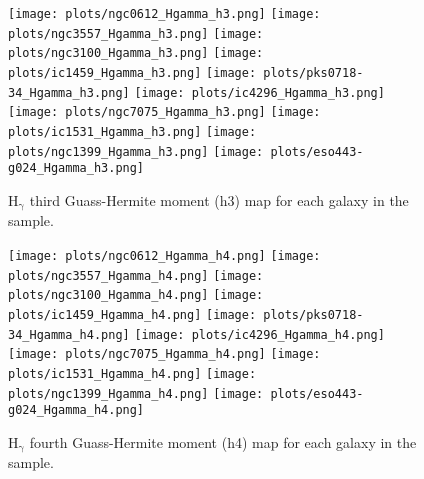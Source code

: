 \documentclass[fleqn,usenatbib,useAMS]{mnras}
\begin{document}
        \begin{figure*}
            \centering
            \texttt{[image: plots/ngc0612\_Hgamma\_h3.png]}
            \texttt{[image: plots/ngc3557\_Hgamma\_h3.png]}
            \texttt{[image: plots/ngc3100\_Hgamma\_h3.png]}
            \texttt{[image: plots/ic1459\_Hgamma\_h3.png]}
            \texttt{[image: plots/pks0718-34\_Hgamma\_h3.png]}
            \texttt{[image: plots/ic4296\_Hgamma\_h3.png]}
            \texttt{[image: plots/ngc7075\_Hgamma\_h3.png]}
            \texttt{[image: plots/ic1531\_Hgamma\_h3.png]}
            \texttt{[image: plots/ngc1399\_Hgamma\_h3.png]}
            \texttt{[image: plots/eso443-g024\_Hgamma\_h3.png]}
            \caption{H$_\mathrm{\gamma}$ third Guass-Hermite moment (h3) map for each galaxy in the sample.}
            \label{fig:Hgamma_h3}
        \end{figure*}


        \begin{figure*}
            \centering
            \texttt{[image: plots/ngc0612\_Hgamma\_h4.png]}
            \texttt{[image: plots/ngc3557\_Hgamma\_h4.png]}
            \texttt{[image: plots/ngc3100\_Hgamma\_h4.png]}
            \texttt{[image: plots/ic1459\_Hgamma\_h4.png]}
            \texttt{[image: plots/pks0718-34\_Hgamma\_h4.png]}
            \texttt{[image: plots/ic4296\_Hgamma\_h4.png]}
            \texttt{[image: plots/ngc7075\_Hgamma\_h4.png]}
            \texttt{[image: plots/ic1531\_Hgamma\_h4.png]}
            \texttt{[image: plots/ngc1399\_Hgamma\_h4.png]}
            \texttt{[image: plots/eso443-g024\_Hgamma\_h4.png]}
            \caption{H$_\mathrm{\gamma}$ fourth Guass-Hermite moment (h4) map for each galaxy in the sample.}
            \label{fig:Hgamma_h4}
        \end{figure*}
\end{document}
